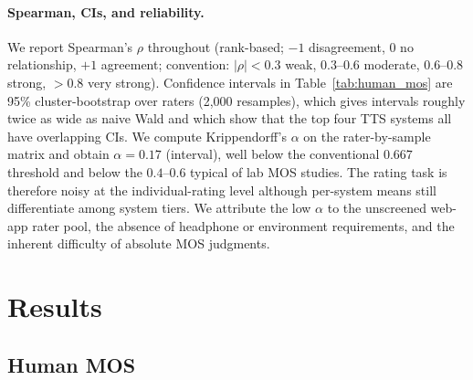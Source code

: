 \documentclass[11pt]{article}
\begin{document}
\paragraph{Spearman, CIs, and reliability.} We report Spearman's $\rho$ throughout (rank-based; $-1$ disagreement, $0$ no relationship, $+1$ agreement; convention: $|\rho|<0.3$ weak, $0.3$--$0.6$ moderate, $0.6$--$0.8$ strong, $>0.8$ very strong). Confidence intervals in Table~\ref{tab:human_mos} are 95\% cluster-bootstrap over raters (2{,}000 resamples), which gives intervals roughly twice as wide as naive Wald and which show that the top four TTS systems all have overlapping CIs. We compute Krippendorff's $\alpha$ on the rater-by-sample matrix and obtain $\alpha = 0.17$ (interval), well below the conventional $0.667$ threshold and below the $0.4$--$0.6$ typical of lab MOS studies. The rating task is therefore noisy at the individual-rating level although per-system means still differentiate among system tiers. We attribute the low $\alpha$ to the unscreened web-app rater pool, the absence of headphone or environment requirements, and the inherent difficulty of absolute MOS judgments.

\section{Results}

\subsection{Human MOS}
\end{document}
